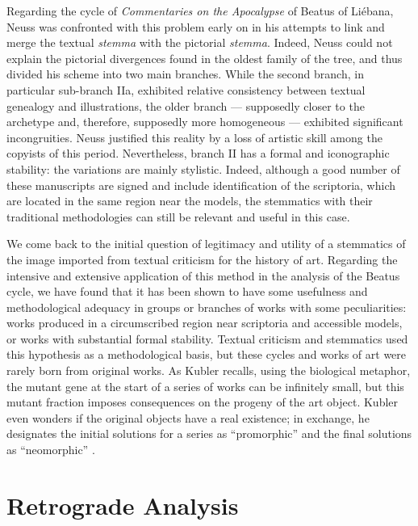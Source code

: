 \documentclass{article}
\begin{document}
Regarding the cycle of \emph{Commentaries on the Apocalypse} of Beatus
of Liébana, Neuss was confronted with this problem early on in his
attempts to link and merge the textual \emph{stemma} with the pictorial
\emph{stemma}. Indeed, Neuss could not explain the pictorial divergences
found in the oldest family of the tree, and thus divided his scheme into
two main branches. While the second branch, in particular sub-branch
IIa, exhibited relative consistency between textual genealogy and
illustrations, the older branch –– supposedly closer to the archetype
and, therefore, supposedly more homogeneous –– exhibited significant
incongruities. Neuss justified this reality by a loss of artistic skill
among the copyists of this period. Nevertheless, branch II has a formal
and iconographic stability: the variations are mainly stylistic. Indeed,
although a good number of these manuscripts are signed and include
identification of the scriptoria, which are located in the same region
near the models, the stemmatics with their traditional methodologies can
still be relevant and useful in this case.

We come back to the initial question of legitimacy and utility of a
stemmatics of the image imported from textual criticism for the history
of art. Regarding the intensive and extensive application of this method
in the analysis of the Beatus cycle, we have found that it has been
shown to have some usefulness and methodological adequacy in groups or
branches of works with some peculiarities: works produced in a
circumscribed region near scriptoria and accessible models, or works
with substantial formal stability. Textual criticism and stemmatics used
this hypothesis as a methodological basis, but these cycles and works of
art were rarely born from original works. As Kubler recalls, using the
biological metaphor, the mutant gene at the start of a series of works
can be infinitely small, but this mutant fraction imposes consequences
on the progeny of the art object. Kubler even wonders if the original
objects have a real existence; in exchange, he designates the initial
solutions for a series as ``promorphic'' and the final solutions as
``neomorphic'' \citep[40]{kubler_shape_1970}.

\section*{Retrograde Analysis}
\end{document}

